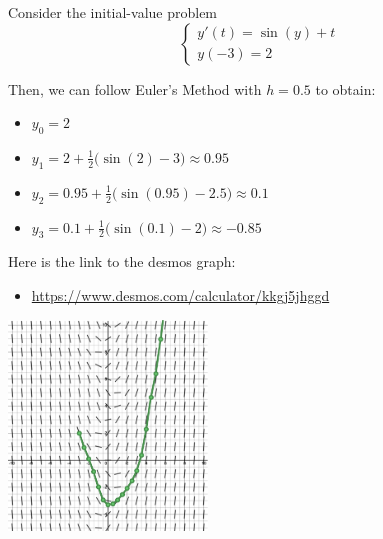 \begin{example}
Consider the initial-value problem
$$
\begin{cases}
y'(t) = \sin(y)+t \\
y(-3)=2
\end{cases}
$$

\begin{minipage}{.65\textwidth}
Then, we can follow Euler's Method with $h=0.5$ to obtain:
\begin{itemize}
	\item $y_0=2$
	\item $y_1 = 2 + \frac12 \big(\sin(2) -3\big) \approx 0.95$
	\item $y_2 = 0.95 + \frac12 \big(\sin(0.95) -2.5\big) \approx 0.1$
	\item $y_3 = 0.1 + \frac12 \big(\sin(0.1) -2\big) \approx -0.85$
\end{itemize}

	
\begin{minipage}{220pt}
Here is the link to the desmos graph: 
\begin{itemize}
	\item \href{https://www.desmos.com/calculator/kkgj5jhggd}{https://www.desmos.com/calculator/kkgj5jhggd} %
\end{itemize}
\end{minipage}
\hfill
\begin{minipage}{55pt}
\end{minipage}
\end{minipage}
\hfill
\begin{minipage}{150pt}
	\includegraphics*[width=150pt]{images/module10-Euler-small.pdf}
\end{minipage}	

\end{example}


